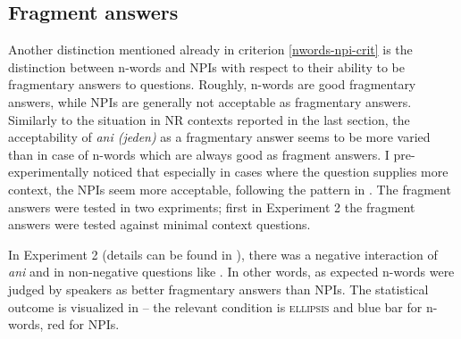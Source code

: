 \documentclass[output=paper, colorlinks, citecolor=brown, newtxmath]{langsci/langscibook}
\begin{document}
\subsection{Fragment answers}\label{fragment-answers}

Another distinction mentioned already in criterion \ref{nwords-npi-crit} is the distinction between n-words and NPIs with respect to their ability to be fragmentary answers to questions. Roughly, n-words are good fragmentary answers, while NPIs are generally not acceptable as fragmentary answers. Similarly to the situation in NR contexts reported in the last section, the acceptability of \textit{ani (jeden)} as a fragmentary answer seems to be more varied than in case of n-words which are always good as fragment answers. I pre-experimentally noticed that especially in cases where the question supplies more context, the NPIs seem more acceptable, following the pattern in . The fragment answers were tested in two expriments; first in Experiment 2 the fragment answers were tested against minimal context questions.

\ea \label{ex-32-5} 
\z
\z


\noindent In Experiment 2 (details can be found in \citealt{docekaldotlacilsubber}), there was a negative interaction of \textit{ani} and  in non-negative questions like . In other words, as expected n-words were judged by speakers as better fragmentary answers than NPIs. The statistical outcome is visualized in  -- the relevant condition is \textsc{ellipsis}  and blue bar for n-words, red for NPIs.

\z
\z
\end{document}
